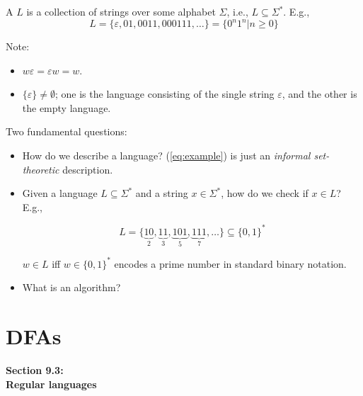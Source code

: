 \begin{frame}
A  $L$ is a collection of strings over some
alphabet $\Sigma$, i.e.,  $L\subseteq\Sigma^*$. E.g.,
\begin{equation}\label{eq:example}
L=\{\varepsilon,01,0011,000111,\ldots\}=\{0^n1^n|n\ge 0\}
\end{equation}

Note:

\begin{itemize}
\item  $w\varepsilon=\varepsilon w=w$.

\item $\{\varepsilon\}\neq\emptyset$; one is the language
consisting of the single string $\varepsilon$, and the other is the
empty language.

\end{itemize}
\end{frame}

\begin{frame}
Two fundamental questions:
\begin{itemize}
\item  How do we describe a language?  (\ref{eq:example}) is just an
{\em informal set-theoretic} description.

\item  Given a language $L\subseteq\Sigma^*$ and a string
$x\in\Sigma^*$, how do we check if $x\in L$?  E.g.,

$$
L=\{\underbrace{10}_2,\underbrace{11}_3,\underbrace{101}_5,
\underbrace{111}_7,\ldots\}\subseteq\{0,1\}^*
$$

$w\in L$ iff $w\in\{0,1\}^*$ encodes a prime number in standard binary
notation.

\item What is an algorithm?
\end{itemize}
\end{frame}

\section{DFAs}

\begin{frame}
\begin{center}
\addtocounter{part}{1}
{\bf Section 9.3: \\ Regular languages}
\end{center}
\end{frame}

